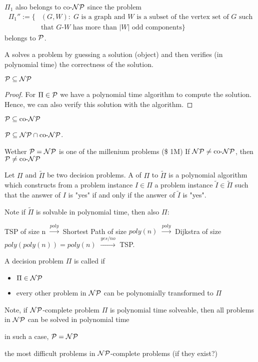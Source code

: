 $\Pi_1$ also belongs to co-$\mathcal{NP}$ since the problem
\begin{align*}
	\Pi_1'':=\{ & (G,W): \; \text{$G$ is a graph and $W$ is a subset of the vertex set of $G$ such} \\ & \text{that $G$-$W$ has more than $|W|$ odd components}\}
\end{align*}
belongs to $\mathcal{P}$.

A  solves a problem by guessing a solution (object) and then verifies (in polynomial time) the correctness of the solution.

\begin{lem}
	$\mathcal{P} \subseteq \mathcal{NP}$
\end{lem}

\begin{proof}
	For $\Pi\in\mathcal{P}$ we have a polynomial time algorithm to compute the solution. Hence, we can also verify this solution with the algorithm.
\end{proof}

\begin{lem}
	$\mathcal{P}\subseteq\text{co-}\mathcal{NP}$
\end{lem}
\begin{cor}
	$\mathcal{P} \subseteq \mathcal{NP} \cap \text{co-}\mathcal{NP}$.
\end{cor}
Wether $\mathcal{P} = \mathcal{NP}$ is one of the millenium problems (\$ 1M)
If $\mathcal{NP} \neq \text{co-}\mathcal{NP}$, then $\mathcal{P} \neq \text{co-}\mathcal{NP}$

\begin{defn}
	Let $\Pi$ and $\tilde \Pi$ be two decision problems. A  of $\Pi$ to $\tilde\Pi$ is a polynomial algorithm which constructs from a problem instance $I \in \Pi$ a problem instance $\tilde I \in \tilde \Pi$ such that the answer of $I$ is "yes" if and only if the answer of $\tilde I$ is "yes".
\end{defn}

Note if $\tilde \Pi$ is solvable in polynomial time, then also $\Pi$:

TSP of size n $\xrightarrow{poly}$ Shortest Path of size $poly(n)$
$\xrightarrow{poly}$ Dijkstra of size $poly(poly(n)) = poly(n)$ $\xrightarrow{yes / no}$ TSP.

\begin{defn}
	A decision problem $\Pi$ is called  if
	\begin{itemize}
		\item $\Pi \in \mathcal{NP}$
		\item every other problem in $\mathcal{NP}$ can be polynomially transformed to $\Pi$
	\end{itemize}
\end{defn}

Note, if $\mathcal{NP}$-complete problem $\Pi$ is polynomial time solveable, then all problems in $\mathcal{NP}$ can be solved in polynomial time

in such a case, $\mathcal{P} = \mathcal{NP}$

the most difficult problems in $\mathcal{NP}$-complete problems (if they exist?)
